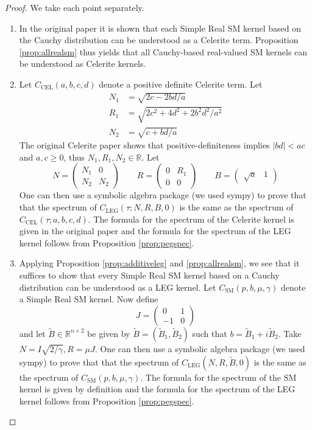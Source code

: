 \documentclass{article}
\theoremstyle{definition}
\newcommand{\LEG}{\mathrm{LEG}}
\newcommand{\SM}{\mathrm{SM}}
\newcommand{\CEL}{\mathrm{CEL}}
\begin{document}
\begin{proof}
We take each point separately.
\begin{enumerate}
    \item In the original paper \cite{foreman2017celerite} it is shown that each Simple Real SM kernel based on the Cauchy distribution can be understood as a Celerite term.  Proposition \ref{prop:allrealsm} thus yields that all Cauchy-based real-valued SM kernels can be understood as Celerite kernels.  
    
    \item Let $C_\CEL(a,b,c,d)$ denote a positive definite Celerite term.  Let 
    \begin{align*}
        N_1&=\sqrt{2c-2bd/a}\\
        R_1&=\sqrt{2c^2 + 4d^2 +2b^2d^2/a^2}\\
        N_2&=\sqrt{c+bd/a}
    \end{align*}
    The original Celerite paper shows that positive-definiteness implies $|bd|<ac$ and $a,c\geq 0$, thus $N_1,R_1,N_2 \in \mathbb{R}$.  Let
    \[
    N=\left(\begin{array}{cc}
    N_{1} & 0\\
    N_{2} & N_{2}
    \end{array}\right)\qquad R=\left(\begin{array}{cc}
    0 & R_{1}\\
    0 & 0
    \end{array}\right)\qquad B=\left(\begin{array}{cc}
    \sqrt{a} & 1\end{array}\right)
    \]
    One can then use a symbolic algebra package (we used sympy) to prove that that the spectrum of  $C_\LEG(\tau;N,R,B,0)$ is the same as the spectrum of $C_\CEL(\tau;a,b,c,d)$.  The formula for the spectrum of the Celerite kernel is given in the original paper and the formula for the spectrum of the LEG kernel follows from Proposition \ref{prop:pegspec}.
    
    \item Applying Proposition \ref{prop:additiveleg} and \ref{prop:allrealsm}, we see that it suffices to show that every Simple Real SM kernel based on a Cauchy distribution can be understood as a LEG kernel.  Let $C_\SM(p,b,\mu,\gamma)$ denote a Simple Real SM kernel.  Now define 
    \[
    J=\left(\begin{array}{cc}
    0 & 1\\
    -1 & 0
    \end{array}\right)
    \]
    and let $\tilde B \in \mathbb{R}^{n \times 2}$ be given by $\tilde B = \left( \tilde B_1, \tilde B_2\right)$ such that $ b = \tilde B_1 + i \tilde B_2$.  Take $N=I\sqrt{2/\gamma},R=\mu J$.  One can then use a symbolic algebra package (we used sympy) to prove that that the spectrum of $C_\LEG(N,R,\tilde B,0)$ is the same as the spectrum of $C_\SM(p,b,\mu,\gamma)$.  The formula for the spectrum of the SM kernel is given by definition and the formula for the spectrum of the LEG kernel follows from Proposition \ref{prop:pegspec}.
\end{enumerate}
\end{proof}
\end{document}

